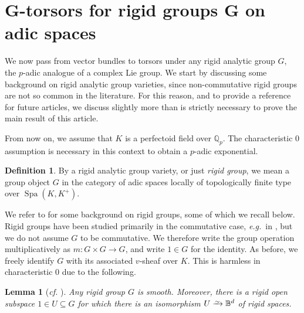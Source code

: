 \documentclass[10pt,a4paper]{article}
\newtheorem{Lemma}[thm]{Lemma}
\theoremstyle{definition}
\newtheorem{Definition}[thm]{Definition}
\theoremstyle{remark}
\newcommand*{\lowsim}{\vbox to 0pt{\vss\hbox{$\scriptstyle\sim$}\vskip-2pt}}
\newcommand*{\isomarrow}{\xrightarrow{\lowsim}}
\newcommand{\B}{\mathbb{B}}
\newcommand{\Q}{\mathbb{Q}}
\newcommand{\Spa}{\operatorname{Spa}}
\numberwithin{equation}{section}
\begin{document}
\section{\texorpdfstring{$\boldsymbol{G}$}{G}-torsors for rigid groups \texorpdfstring{$\boldsymbol{G}$}{G} on adic spaces}
We now pass from vector bundles to torsors under any rigid analytic group $G$, the $p$-adic analogue of a complex Lie group. We start by discussing some background on rigid analytic group varieties, since non-commutative rigid groups are not so common in the literature. For this reason, and to provide a reference for future articles, we discuss slightly more than is strictly necessary to prove the main result of this article.
\medskip

From now on, we assume that $K$ is a perfectoid field over $\Q_p.$ The characteristic $0$ assumption is necessary in this context to obtain a $p$-adic exponential.

\begin{Definition}
  By a rigid analytic group variety, or just \emph{rigid group}, we mean a group object $G$ in the category of adic spaces locally of topologically finite type over $\Spa(K,K^+)$.
 \end{Definition}

We refer to \cite[Sections~1.2--1.3]{Fargues-groupes-analytiques} for some background on rigid groups, some of which we recall below.
  Rigid groups have been studied primarily in the commutative case, \textit{e.g.}~in \cite{Lutkebohmert_structure_of_bounded}, but we do not assume $G$ to be commutative. We therefore write the group operation multiplicatively as $m\colon G\times G\to G$, and write $1\in G$ for the identity.
As before, we freely identify $G$ with its associated $v$-sheaf over $K$. This is harmless in characteristic $0$ due to the following. 

\begin{Lemma}[\textit{cf.} {\cite[Proposition 1]{Fargues-groupes-analytiques}}]\label{l:G-smooth}
	Any rigid group $G$ is smooth. Moreover, there is a rigid open subspace $1\in U\subseteq G$ for which there is an isomorphism $U\isomarrow \B^d$ of rigid spaces.
\end{Lemma}
\end{document}
